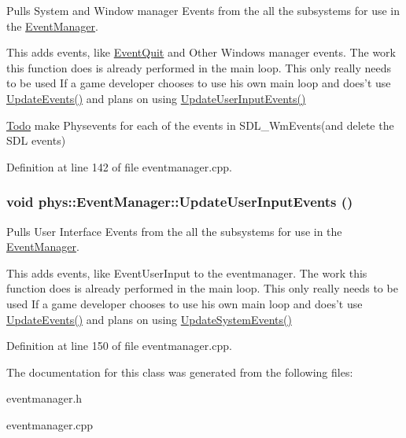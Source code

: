 Pulls System and Window manager Events from the all the subsystems for use in the \hyperlink{classphys_1_1EventManager}{EventManager}. 

This adds events, like \hyperlink{classphys_1_1EventQuit}{EventQuit} and Other Windows manager events. The work this function does is already performed in the main loop. This only really needs to be used If a game developer chooses to use his own main loop and does't use \hyperlink{classphys_1_1EventManager_a63cf23dc9fe0ced3e2c60ca61c97b166}{UpdateEvents()} and plans on using \hyperlink{classphys_1_1EventManager_a01a5a131ac26679eee5dcf5dd514045c}{UpdateUserInputEvents()} 

\begin{Desc}
\item[\hyperlink{todo__todo000004}{Todo}]make Physevents for each of the events in SDL\_\-WmEvents(and delete the SDL events) \end{Desc}




Definition at line 142 of file eventmanager.cpp.

\hypertarget{classphys_1_1EventManager_a01a5a131ac26679eee5dcf5dd514045c}{
\subsubsection[{UpdateUserInputEvents}]{\setlength{\rightskip}{0pt plus 5cm}void phys::EventManager::UpdateUserInputEvents ()}}
\label{da/dde/classphys_1_1EventManager_a01a5a131ac26679eee5dcf5dd514045c}


Pulls User Interface Events from the all the subsystems for use in the \hyperlink{classphys_1_1EventManager}{EventManager}. 

This adds events, like EventUserInput to the eventmanager. The work this function does is already performed in the main loop. This only really needs to be used If a game developer chooses to use his own main loop and does't use \hyperlink{classphys_1_1EventManager_a63cf23dc9fe0ced3e2c60ca61c97b166}{UpdateEvents()} and plans on using \hyperlink{classphys_1_1EventManager_a0cf574c55def063d66d7db46a4d3e8a5}{UpdateSystemEvents()} 

Definition at line 150 of file eventmanager.cpp.



The documentation for this class was generated from the following files:\begin{DoxyCompactItemize}
\item 
eventmanager.h\item 
eventmanager.cpp\end{DoxyCompactItemize}
